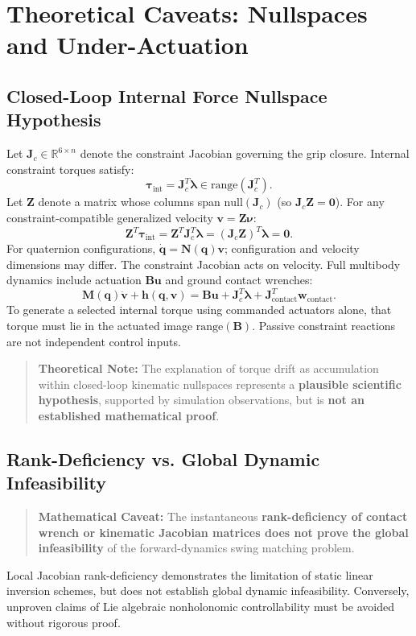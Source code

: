 \documentclass[11pt,a4paper]{article}
\begin{document}
\section{Theoretical Caveats: Nullspaces and Under-Actuation}

\subsection{Closed-Loop Internal Force Nullspace Hypothesis}
Let $\mathbf{J}_c \in \mathbb{R}^{6 \times n}$ denote the constraint Jacobian governing the grip closure. Internal constraint torques satisfy:
\begin{equation}
    \boldsymbol{\tau}_{\text{int}} = \mathbf{J}_c^T \boldsymbol{\lambda} \in \text{range}(\mathbf{J}_c^T).
\end{equation}
Let $\mathbf{Z}$ denote a matrix whose columns span $\text{null}(\mathbf{J}_c)$ (so $\mathbf{J}_c \mathbf{Z} = \mathbf{0}$). For any constraint-compatible generalized velocity $\mathbf{v} = \mathbf{Z} \boldsymbol{\nu}$:
\begin{equation}
    \mathbf{Z}^T \boldsymbol{\tau}_{\text{int}} = \mathbf{Z}^T \mathbf{J}_c^T \boldsymbol{\lambda} = (\mathbf{J}_c \mathbf{Z})^T \boldsymbol{\lambda} = \mathbf{0}.
\end{equation}
For quaternion configurations, $\dot{\mathbf{q}}=\mathbf{N}(\mathbf{q})\mathbf{v}$; configuration and velocity dimensions may differ. The constraint Jacobian acts on velocity. Full multibody dynamics include actuation $\mathbf{B} \mathbf{u}$ and ground contact wrenches:
\begin{equation}
    \mathbf{M}(\mathbf{q}) \dot{\mathbf{v}} + \mathbf{h}(\mathbf{q}, \mathbf{v}) = \mathbf{B} \mathbf{u} + \mathbf{J}_c^T \boldsymbol{\lambda} + \mathbf{J}_{\text{contact}}^T \mathbf{w}_{\text{contact}}.
\end{equation}
To generate a selected internal torque using commanded actuators alone, that
torque must lie in the actuated image $\text{range}(\mathbf{B})$. Passive
constraint reactions are not independent control inputs.
\begin{quote}
\textbf{Theoretical Note:} The explanation of torque drift as accumulation within closed-loop kinematic nullspaces represents a \textbf{plausible scientific hypothesis}, supported by simulation observations, but is \textbf{not an established mathematical proof}.
\end{quote}

\subsection{Rank-Deficiency vs. Global Dynamic Infeasibility}
\begin{quote}
\textbf{Mathematical Caveat:} The instantaneous \textbf{rank-deficiency of contact wrench or kinematic Jacobian matrices does not prove the global infeasibility} of the forward-dynamics swing matching problem.
\end{quote}
Local Jacobian rank-deficiency demonstrates the limitation of static linear inversion schemes, but does not establish global dynamic infeasibility. Conversely, unproven claims of Lie algebraic nonholonomic controllability must be avoided without rigorous proof.
\end{document}
